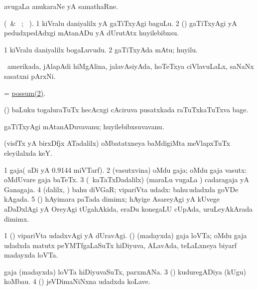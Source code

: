  avugaLa anukaraNe yA samathaRne.
\eanum
\emng
\eentry

\bentry
{} 
\gl{\akirx} 
\bmng
(\BU\ \& \BUkaq\ ; \vakaq\ ). 
\bnum
\num{1} kiVralu daniyalilx yA gaTiTxyAgi baguLu. 
\num{2} (\AmA) gaTiTxyAgi yA pedudxpedAdxgi mAtanADu yA dUrutAtx huyilebibxsu.
\enum
\emng
\eentry

\bentry
{} 
\gl{\nA}
\bmng
\bnum
\num{1} kiVralu daniyalilx bogaLuvudu. 
\num{2} gaTiTxyAda mAtu; huyilu.
\enum
\emng
\eentry

\bentry
{} 
\gl{\nA} 
\bmng
\da\ amerikada, jAlapAdi hiMgAlina, jalavAsiyAda, hoTeTxya ciVlavuLaLx, saNaNx sasatxni pArxNi.
\emng
\eentry

\bentry 
{} 
\gl{\nA}
\bmng
= \hyperref{kandict_p.pdf}{P}{possum(2)}{possum(2)}.
\emng 
\eentry

\bentry
{} 
\gl{\nA} 
\bmng
(\birx) baLuku togaluraTuTx hecAcxgi cAciruva pusatxkada raTuTxkaTuTxva bage.
\emng
\eentry

\bentry
{} 
\gl{\nA} 
\bmng
gaTiTxyAgi mAtanADuvavanu; huyilebibxsuvavanu.
\emng
\eentry

\bentry
{} 
\gl{\nA} 
\bmng
(visfTx  yA birxDfjx ATadalilx) oMbatatxneya baMdigiMta meVlapxTuTx eleyilalxda keY.
\emng
\eentry

\bentry
{} 
\gl{\nA} 
\bmng
\bnum
\num{1} gaja( aDi yA 0.9144 miVTarf).
\num{2} (vasutxvina) oMdu gaja; oMdu gaja vasutx:  oMdUvare gaja baTeTx. 
\num{3} (\kanmu\ kaTaTxDadalilx) (maraLu \mo vugaLa \vi) cadaragaja yA Ganagaja.
\num{4} (\bava dalilx, \AmA) bahu diVGaR; vipariVta udadx:   bahu\,udadxda goVDe kAgada. 
\num{5} (\nw) hAyimara paTada dimimx; hAyige AsareyAgi yA kUvege aDaDxlAgi yA OreyAgi tUgahAkida, eraDu konegaLU cUpAda, uruLeyAkArada dimimx.
\enum
\emng

\noindent
\gl{\pagu}
\bmng
\bnum
\num{1}  (\rUpa) vipariVta udadxvAgi yA dUravAgi. 
  (\birx) 
\banum
{}  (madayxda) gaja loVTa; oMdu gaja udadxda matutx  peYMTfgaLaSuTx hiDiyuva, ALavAda, teLaLxneya biyarf madayxda loVTa.

 gaja (madayxda) loVTa hiDiyuvaSuTx, parxmANa. 
\eanum
\numie
\num{3}  (\birx) kuduregADiya (kUgu) koMbau. 
\num{4}  (\birx) jeVDimaNiNxna udadxda koLave.
\enum
\emng
\eentry

